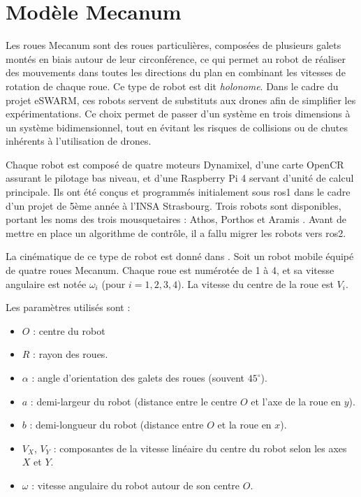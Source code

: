 \chapter{Modèle Mecanum}
\label{chap:mecanum}

Les roues Mecanum sont des roues particulières, composées de plusieurs galets montés en biais autour de leur circonférence, ce qui permet au robot de réaliser des mouvements dans toutes les directions du plan en combinant les vitesses de rotation de chaque roue. Ce type de robot est dit \textit{holonome}.
Dans le cadre du projet eSWARM, ces robots servent de substituts aux drones afin de simplifier les expérimentations. Ce choix permet de passer d’un système en trois dimensions à un système bidimensionnel, tout en évitant les risques de collisions ou de chutes inhérents à l’utilisation de drones. 

Chaque robot est composé de quatre moteurs Dynamixel, d'une carte OpenCR assurant le pilotage bas niveau, et d'une Raspberry Pi 4 servant d’unité de calcul principale.
Ils ont été conçus et programmés initialement sous \gls{ros1} dans le cadre d’un projet de 5ème année à l’INSA Strasbourg. Trois robots sont disponibles, portant les noms des trois mousquetaires : Athos, Porthos et Aramis \cite{vrignaud_swarm_2025}.
Avant de mettre en place un algorithme de contrôle, il a fallu migrer les robots vers \gls{ros2}. 

La cinématique de ce type de robot est donné dans \cite{tan_research_2021}.
Soit un robot mobile équipé de quatre roues Mecanum. Chaque roue est numérotée de 1 à 4, et sa vitesse angulaire est notée $\omega_i$ (pour $i = 1, 2, 3, 4$). La vitesse du centre de la roue est $V_i$.

Les paramètres utilisés sont :
\begin{itemize}
\item $O$ : centre du robot
  \item $R$ : rayon des roues.
  \item $\alpha$ : angle d’orientation des galets des roues (souvent $45^\circ$).
  \item $a$ : demi-largeur du robot (distance entre le centre $O$ et l’axe de la roue en $y$).
  \item $b$ : demi-longueur du robot (distance entre $O$ et la roue en $x$).
  \item $V_X$, $V_Y$ : composantes de la vitesse linéaire du centre du robot selon les axes $X$ et $Y$.
  \item $\omega$ : vitesse angulaire du robot autour de son centre $O$.
\end{itemize}

